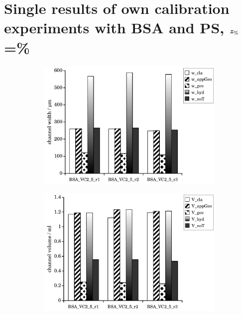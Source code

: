 \section*{Single results of own calibration experiments with BSA and PS, 
  $\bm{z_\text{\%}}$\thinspace=\thinspace\%}
\renewcommand{\subFigSize}{0.49\linewidth}
\begin{figure}[htp]
  \begin{center}
    \begin{subfigure}{\subFigSize}
      \includegraphics[width=\linewidth]{./images/data/eval_own_p16/calibW_BSA_VC_2_5_p16.pdf}
    \end{subfigure}
    \begin{subfigure}{\subFigSize}
      \includegraphics[width=\linewidth]{./images/data/eval_own_p16/calibV_BSA_VC_2_5_p16.pdf}

\end{subfigure}
\end{center}
\end{figure}
